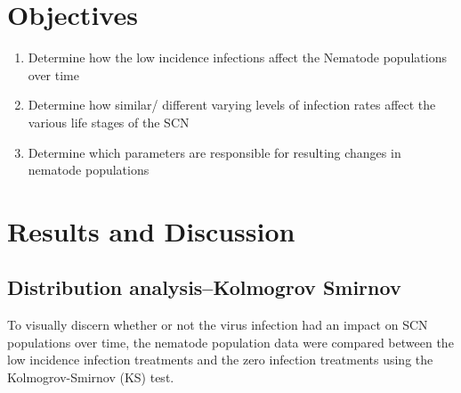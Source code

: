 \section{Objectives}
\begin{enumerate}
\item Determine how the low incidence infections affect the Nematode populations over time
\item Determine how similar/ different varying levels of infection rates affect the various life stages of the SCN
\item Determine which parameters are responsible for resulting changes in nematode populations
\end{enumerate}

\section{Results and Discussion}


\subsection{Distribution analysis--Kolmogrov Smirnov}

To visually discern whether or not the virus infection had an impact on SCN populations over time, the nematode population data were compared between the low incidence infection treatments and the zero infection treatments using the Kolmogrov-Smirnov (KS) test.  

